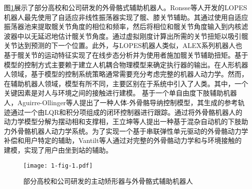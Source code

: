 图\ref{fig:1-1}展示了部分高校和公司研发的外骨骼式辅助机器人。Ronsse等人\cite{ronsseOscillatorbasedAssistanceCyclical2011c}开发的LOPES机器人最先使用了自适应非线性振荡器实现了髋、膝关节辅助。其通过使用自适应振荡器池来提取髋关节角度的相位和频率，然后将相位和髋关节角度输入到内核滤波器中以无延迟地估计髋关节角度。通过虚拟刚度计算出所需的关节扭矩以吸引髋关节达到预测的下一个位置。此外，与LOPES机器人类似，ALEX系列机器人\cite{winfreeDesignMinimallyConstraining2011,stegallVariableDampingForce2017,hidayahGaitAdaptationUsing2020}也基于髋关节的运动特征实现了在线步态分析并为使用者施加髋关节辅助扭矩。基于模型的控制方式主要赖于建立人机耦合物理模型来确定执行器的输出。在人形机器人领域，基于模型的控制系统策略通常需要充分考虑完整的机器人动力学。然而，在辅助机器人领域，模型有所不同，主要区别在于系统中引入了人类。其中，一个关键因素是对人与环境之间的接触进行建模\cite{youngStateArtFuture2017a}。 基于一个单自由度下肢辅助机器人，Aguirre-Ollinger等人\cite{aguirre-ollingerInertiaCompensationControl2012}提出了一种人体-外骨骼导纳控制模型，其生成的参考轨迹通过一个由LQR和积分项组成的闭环控制器进行跟踪。通过将外骨骼机器人的动力学模型分解为摆动相和支撑相，王立坤等人\cite{WangXiaZhiZhuLiWaiGuGeJiQiRenKongZhiXiTongRenJiGongRongCeLueYanJiu2019}提出一种基于混杂自动机的下肢助力外骨骼机器人动力学系统。为了实现一个基于串联弹性单元驱动的外骨骼动力学补偿和用户特定的辅助，Vantilt等人\cite{vantiltModelbasedControlExoskeletons2019}通过对完整的外骨骼动力学和与环境接触的建模，实现了用户由坐到站的辅助。

\begin{figure}[h]
  \centering
  \texttt{[image: 1-fig-1.pdf]}
  \caption{部分高校和公司研发的主动矫形器与外骨骼式辅助机器人}
  \label{fig:1-1}
\end{figure}

